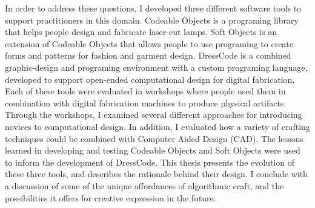In order to address these questions,  I developed three different software tools to support practitioners in this domain. Codeable Objects is a programing library that helps people design and fabricate laser-cut lamps. Soft Objects is an extension of Codeable Objects that allows people to use programing to create forms and patterns for fashion and garment design. DressCode is a combined graphic-design and programing environment with a custom programing language, developed to support open-ended computational design for digital fabrication. Each of these tools were evaluated in workshops where people used them in combination with digital fabrication machines to produce physical artifacts. Through the workshops, I examined several different approaches for introducing novices to computational design. In addition, I evaluated how a variety of crafting techniques could be combined with Computer Aided Design (CAD). The lessons learned in developing and testing Codeable Objects and Soft Objects were used to inform the development of DressCode. This thesis presents the evolution of these three tools, and describes the rationale behind their design. I conclude with a discussion of some of the unique affordances of algorithmic craft, and the possibilities it offers for creative expression in the future.  